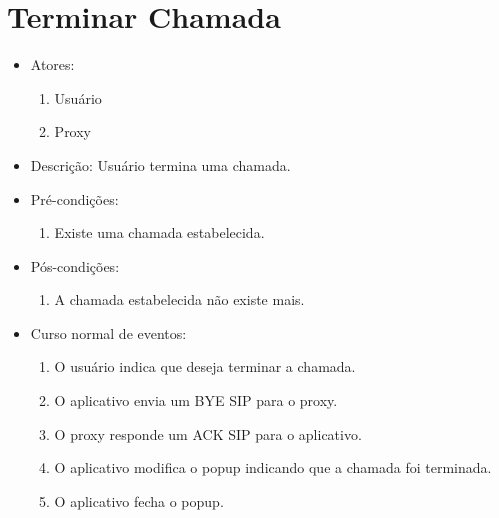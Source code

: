 \documentclass[12pt,a4paper]{article}
\begin{document}
\section{Terminar Chamada}
\begin{itemize}
	\item Atores:
	\begin{enumerate}
		\item Usu\'{a}rio
		\item Proxy
	\end{enumerate}
	\item Descri\c{c}\~{a}o: Usu\'{a}rio termina uma chamada.
	\item Pr\'{e}-condi\c{c}\~{o}es:
	\begin{enumerate}
		\item Existe uma chamada estabelecida.
	\end{enumerate}
	\item P\'{o}s-condi\c{c}\~{o}es:
	\begin{enumerate}
		\item A chamada estabelecida n\~{a}o existe mais.
	\end{enumerate}
	\item Curso normal de eventos:
	\begin{enumerate}
        \item O usu\'{a}rio indica que deseja terminar a chamada.
        \item O aplicativo envia um BYE SIP para o proxy.
        \item O proxy responde um ACK SIP para o aplicativo.
        \item O aplicativo modifica o popup indicando que a chamada foi terminada.
        \item O aplicativo fecha o popup.
	\end{enumerate}	
\end{itemize}
\end{document}
